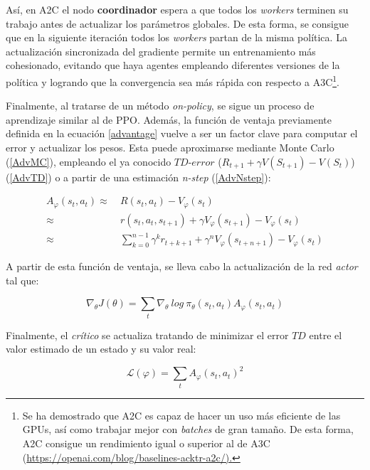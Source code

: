Así, en A2C el nodo \textbf{coordinador} espera a que todos los \textit{workers} terminen su trabajo antes de actualizar los parámetros globales. De esta forma, se consigue que en la siguiente iteración todos los \textit{workers} partan de la misma política. La actualización sincronizada del gradiente permite un entrenamiento más cohesionado, evitando que haya agentes empleando diferentes versiones de la política y logrando que la convergencia sea más rápida con respecto a A3C\footnote{Se ha demostrado que A2C es capaz de hacer un uso más eficiente de las GPUs, así como trabajar mejor con \textit{batches} de gran tamaño. De esta forma, A2C consigue un rendimiento igual o superior al de A3C (\url{https://openai.com/blog/baselines-acktr-a2c/).}}.

Finalmente, al tratarse de un método \textit{on-policy}, se sigue un proceso de aprendizaje similar al de PPO. Además, la función de ventaja previamente definida en la ecuación \ref{advantage} vuelve a ser un factor clave para computar el error y actualizar los pesos. Esta puede aproximarse mediante Monte Carlo (\ref{AdvMC}), empleando el ya conocido $TD$-$error$ ($R_{t+1} + \gamma V(S_{t+1}) - V(S_t)$) (\ref{AdvTD}) o a partir de una estimación \textit{n-step} (\ref{AdvNstep}):

\begin{align}
    A_\varphi(s_t,a_t) \approx\ & R(s_t, a_t) - V_\varphi(s_t) \label{AdvMC} \\
                       \approx\ & r(s_t,a_t,s_{t+1}) + \gamma V_\varphi(s_{t+1}) - V_\varphi(s_t) \label{AdvTD} \\
                       \approx\ & \sum_{k=0}^{n-1}\gamma^k r_{t+k+1} + \gamma^n V_\varphi(s_{t+n+1}) - V_\varphi(s_t) \label{AdvNstep}
\end{align}

A partir de esta función de ventaja, se lleva cabo la actualización de la red \textit{actor} tal que:

\begin{equation}
    \nabla_\theta J(\theta) = \sum_t \nabla_\theta\ log\ \pi_\theta(s_t,a_t) A_\varphi(s_t,a_t)
\end{equation}

Finalmente, el \textit{crítico} se actualiza tratando de minimizar el error $TD$ entre el valor estimado de un estado y su valor real:

    \begin{equation}
            \mathcal{L}(\varphi) = \sum_t A_\varphi(s_t,a_t)^2
    \end{equation}

